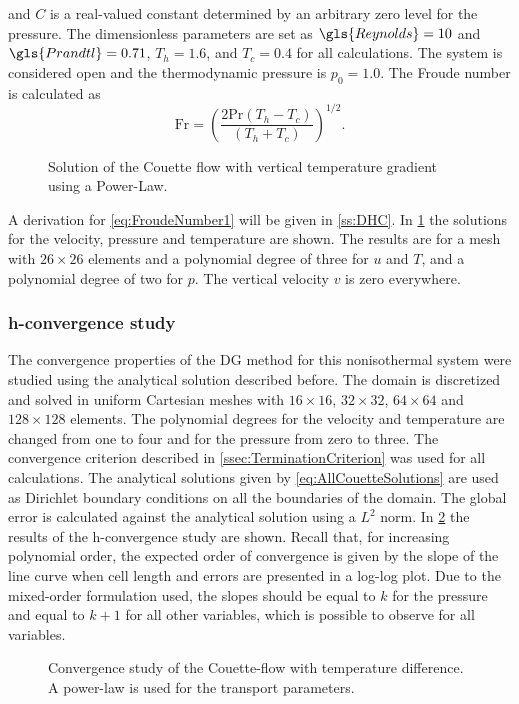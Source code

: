 and $C$ is a real-valued constant determined by an arbitrary zero level for the pressure. The dimensionless parameters are set as $\gls{Reynolds} = 10$ and $\gls{Prandtl} =0.71$, $T_h = 1.6$, and $T_c = 0.4$ for all calculations. The system is considered open and the thermodynamic pressure is $p_0 =1.0$. The Froude number is calculated as
\begin{equation}
	\text{Fr} = \left( \frac{2\text{Pr}(T_h-T_c)}{(T_h+T_c)}\right)^{1/2}.\label{eq:FroudeNumber1}
\end{equation}%
\begin{center}
	\begin{figure}[bt]
		\pgfplotsset{
			group/xticklabels at=edge bottom,
		}
		\caption{Solution of the Couette flow with vertical temperature gradient using a Power-Law.}\label{fig:CouetteSolution}
	\end{figure}
\end{center}%
A derivation for \cref{eq:FroudeNumber1} will be given in \cref{ss:DHC}. In \cref{fig:CouetteSolution} the solutions for the velocity, pressure and temperature are shown. The results are for a mesh with $26\times26$ elements and a polynomial degree of three for $u$ and $T$, and a polynomial degree of two for $p$. The vertical velocity $v$ is zero everywhere. 
\subsubsection{h-convergence study}
The convergence properties of the DG method for this nonisothermal system were studied using the analytical solution described before. The domain is discretized and solved in uniform Cartesian meshes with $16\times16$, $32\times32$, $64\times64$ and $128\times128$ elements. The polynomial degrees for the velocity and temperature are changed from one to four and for the pressure from zero to three. The convergence criterion described in \cref{ssec:TerminationCriterion} was used for all calculations. The analytical solutions given by \cref{eq:AllCouetteSolutions} are used as Dirichlet boundary conditions on all the boundaries of the domain. The global error is calculated against the analytical solution using a $L^2$ norm. 
In \cref{fig:ConvergenceCFTD} the results of the h-convergence study are shown.  Recall that, for increasing polynomial order, the expected order of convergence is given by the slope of the line curve when cell length and errors are presented in a log-log plot. Due to the mixed-order formulation used, the slopes should be equal to $k$ for the pressure and equal to $k+1$ for all other variables, which is possible to observe for all variables.%
\begin{figure}[t!]
	\centering
	\pgfplotsset{width=0.34\textwidth, compat=1.3}
	\caption{Convergence study of the Couette-flow with temperature difference. A power-law is used for the transport parameters.}\label{fig:ConvergenceCFTD}
\end{figure}
